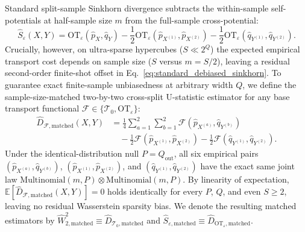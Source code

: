 \documentclass[aps,prapplied,reprint,longbibliography]{revtex4-2}
\begin{document}
Standard split-sample Sinkhorn divergence subtracts the within-sample self-potentials at half-sample size $m$ from the full-sample cross-potential:
\begin{equation}
\widehat{S}_\varepsilon(X, Y) = \mathrm{OT}_\varepsilon(\hat{p}_X, \hat{q}_Y) - \frac{1}{2}\mathrm{OT}_\varepsilon(\hat{p}_{X^{(1)}}, \hat{p}_{X^{(2)}}) - \frac{1}{2}\mathrm{OT}_\varepsilon(\hat{q}_{Y^{(1)}}, \hat{q}_{Y^{(2)}}).
\label{eq:standard_debiased_sinkhorn}
\end{equation}
Crucially, however, on ultra-sparse hypercubes ($S \ll 2^Q$) the expected empirical transport cost depends on sample size ($S$ versus $m = S/2$), leaving a residual second-order finite-shot offset in Eq.~\eqref{eq:standard_debiased_sinkhorn}. To guarantee exact finite-sample unbiasedness at arbitrary width $Q$, we define the sample-size-matched two-by-two cross-split U-statistic estimator for any base transport functional $\mathcal{F} \in \{\mathcal{T}_0, \mathrm{OT}_\varepsilon\}$:
\begin{align}
\widehat{D}_{\mathcal{F},\mathrm{matched}}(X, Y) &= \frac{1}{4}\sum_{a=1}^{2}\sum_{b=1}^{2} \mathcal{F}\!\left(\hat{p}_{X^{(a)}}, \hat{q}_{Y^{(b)}}\right) \nonumber\\
&\quad - \frac{1}{2}\mathcal{F}\!\left(\hat{p}_{X^{(1)}}, \hat{p}_{X^{(2)}}\right) - \frac{1}{2}\mathcal{F}\!\left(\hat{q}_{Y^{(1)}}, \hat{q}_{Y^{(2)}}\right).
\label{eq:matched_ustats}
\end{align}
Under the identical-distribution null $P = Q_{\mathrm{out}}$, all six empirical pairs $(\hat{p}_{X^{(a)}}, \hat{q}_{Y^{(b)}})$, $(\hat{p}_{X^{(1)}}, \hat{p}_{X^{(2)}})$, and $(\hat{q}_{Y^{(1)}}, \hat{q}_{Y^{(2)}})$ have the exact same joint law $\mathrm{Multinomial}(m, P) \otimes \mathrm{Multinomial}(m, P)$. By linearity of expectation, $\mathbb{E}[\widehat{D}_{\mathcal{F},\mathrm{matched}}(X, Y)] = 0$ holds identically for every $P$, $Q$, and even $S \ge 2$, leaving no residual Wasserstein sparsity bias. We denote the resulting matched estimators by $\widehat{W}_{2,\mathrm{matched}}^2 \equiv \widehat{D}_{\mathcal{T}_0,\mathrm{matched}}$ and $\widehat{S}_{\varepsilon,\mathrm{matched}} \equiv \widehat{D}_{\mathrm{OT}_\varepsilon,\mathrm{matched}}$.
\end{document}
